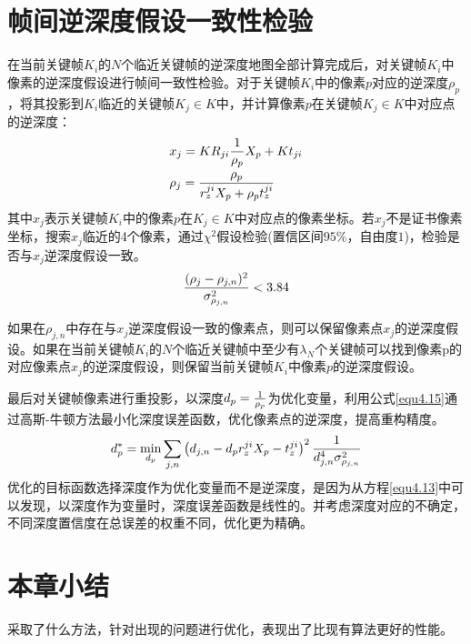 \section{帧间逆深度假设一致性检验}
在当前关键帧$K_i$的$N$个临近关键帧的逆深度地图全部计算完成后，对关键帧$K_i$中像素的逆深度假设进行帧间一致性检验。对于关键帧$K_i$中的像素$p$对应的逆深度$\rho_p$，将其投影到$K_i$临近的关键帧$K_j \in K$中，并计算像素$p$在关键帧$K_j \in K$中对应点的逆深度：
\begin{equation}
\label{equ4.13}
\begin{aligned}
& x_j = K R_{ji} {1 \over \rho_p} X_p + Kt_{ji} \\ 
& \rho_j = { \rho_p \over r_z^{ji}X_p+\rho_p t_z^{ji} }
\end{aligned}
\end{equation}
其中$x_{j}$表示关键帧$K_i$中的像素$p$在$K_j \in K$中对应点的像素坐标。若$x_j$不是证书像素坐标，搜索$x_{j}$临近的4个像素，通过$\chi^2$假设检验(置信区间$95\%$，自由度$1$)，检验是否与$x_j$逆深度假设一致。
\begin{equation}
\label{equ4.14}
{ (\rho_j - \rho_{j,n})^2 \over \sigma_{\rho_{j,n}}^2 } < 3.84
\end{equation}

如果在$\rho_{j,n}$中存在与$x_j$逆深度假设一致的像素点，则可以保留像素点$x_j$的逆深度假设。如果在当前关键帧$K_i$的$N$个临近关键帧中至少有$\lambda_N$个关键帧可以找到像素p的对应像素点$x_j$的逆深度假设，则保留当前关键帧$K_i$中像素$p$的逆深度假设。

最后对关键帧像素进行重投影，以深度$d_p = { 1 \over \rho_p }$为优化变量，利用公式\ref{equ4.15}通过高斯-牛顿方法最小化深度误差函数，优化像素点的逆深度，提高重构精度。
\begin{equation}
\label{equ4.15}
d_p^* = \min_{d_p} \sum\limits_{j,n} \left( d_{j,n} - d_p r_z^{ji} X_p - t_z^{ji}  \right)^2  {1 \over {d_{j,n}^4 \sigma_{\rho_{j,n}}^2 }}
\end{equation}
优化的目标函数选择深度作为优化变量而不是逆深度，是因为从方程\ref{equ4.13}中可以发现，以深度作为变量时，深度误差函数是线性的。并考虑深度对应的不确定，不同深度置信度在总误差的权重不同，优化更为精确。




\section{本章小结}

采取了什么方法，针对出现的问题进行优化，表现出了比现有算法更好的性能。







